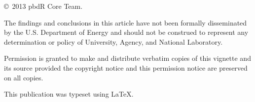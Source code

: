 \null
\vfill
\copyright\ 2013 pbdR Core Team.

The findings and conclusions in this article have not been
formally disseminated by the U.S. Department of Energy
and should not be construed to represent any determination or
policy of University, Agency, and National Laboratory.

Permission is granted to make and distribute verbatim copies of
this vignette and its source provided the copyright notice and
this permission notice are preserved on all copies.

This publication was typeset using \LaTeX.
